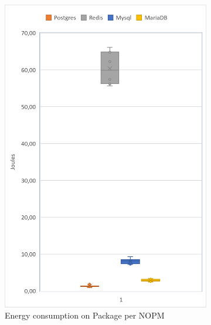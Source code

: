 \begin{figure}[!ht]
        \centering
        \begin{subfigure}[b]{0.32\textwidth}
            \centering
			\includegraphics[width=1\columnwidth]{results/boxplot/10m/Packgage-nopm.png}
			\caption[]%
            {{\small Energy consumption on Package per NOPM}}    
			\label{fig:bocplotnopmpackage10m}
        \end{subfigure}
        \begin{subfigure}[b]{0.32\textwidth}  
            \centering 

\end{subfigure}
\end{figure}
